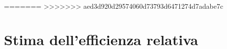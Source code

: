 \documentclass[twocolumn,10pt]{asme2ej}
\begin{document}
=======
>>>>>>> aed3d920d29574060d73793d6471274d7adabe7c






\section{Stima dell'efficienza relativa}\label{s:efficienza}
\end{document}
